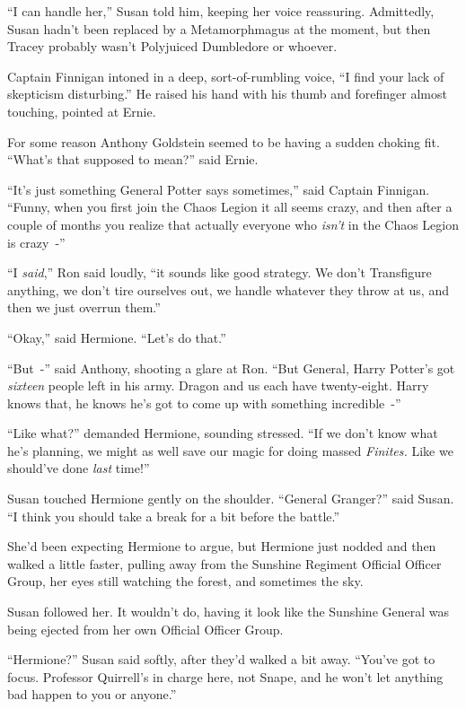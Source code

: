 ``I can handle her,'' Susan told him, keeping her voice reassuring. Admittedly, Susan hadn't been replaced by a Metamorphmagus at the moment, but then Tracey probably wasn't Polyjuiced Dumbledore or whoever.

Captain Finnigan intoned in a deep, sort-of-rumbling voice, ``I find your lack of skepticism disturbing.'' He raised his hand with his thumb and forefinger almost touching, pointed at Ernie.

For some reason Anthony Goldstein seemed to be having a sudden choking fit. ``What's that supposed to mean?'' said Ernie.

``It's just something General Potter says sometimes,'' said Captain Finnigan. ``Funny, when you first join the Chaos Legion it all seems crazy, and then after a couple of months you realize that actually everyone who \emph{isn't} in the Chaos Legion is crazy~-''

``I \emph{said},'' Ron said loudly, ``it sounds like good strategy. We don't Transfigure anything, we don't tire ourselves out, we handle whatever they throw at us, and then we just overrun them.''

``Okay,'' said Hermione. ``Let's do that.''

``But~-'' said Anthony, shooting a glare at Ron. ``But General, Harry Potter's got \emph{sixteen} people left in his army. Dragon and us each have twenty-eight. Harry knows that, he knows he's got to come up with something incredible~-''

``Like what?'' demanded Hermione, sounding stressed. ``If we don't know what he's planning, we might as well save our magic for doing massed \emph{Finites.} Like we should've done \emph{last} time!''

Susan touched Hermione gently on the shoulder. ``General Granger?'' said Susan. ``I think you should take a break for a bit before the battle.''

She'd been expecting Hermione to argue, but Hermione just nodded and then walked a little faster, pulling away from the Sunshine Regiment Official Officer Group, her eyes still watching the forest, and sometimes the sky.

Susan followed her. It wouldn't do, having it look like the Sunshine General was being ejected from her own Official Officer Group.

``Hermione?'' Susan said softly, after they'd walked a bit away. ``You've got to focus. Professor Quirrell's in charge here, not Snape, and he won't let anything bad happen to you or anyone.''

